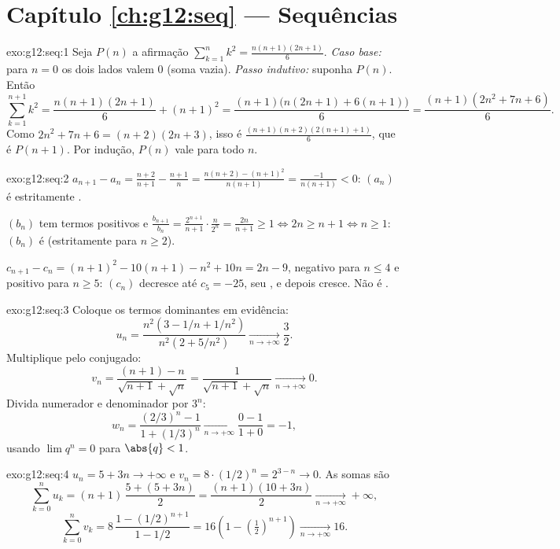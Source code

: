 \section*{Capítulo \ref{ch:g12:seq} --- Sequências}

\begin{solution}{exo:g12:seq:1}
Seja $P(n)$ a afirmação
$\sum_{k=1}^{n} k^2 = \frac{n(n+1)(2n+1)}{6}$.
\emph{Caso base:} para $n = 0$ os dois lados valem $0$ (soma vazia).
\emph{Passo indutivo:} suponha $P(n)$. Então
\[
\sum_{k=1}^{n+1} k^2 = \frac{n(n+1)(2n+1)}{6} + (n+1)^2
= \frac{(n+1)\bigl(n(2n+1) + 6(n+1)\bigr)}{6}
= \frac{(n+1)(2n^2 + 7n + 6)}{6}.
\]
Como $2n^2 + 7n + 6 = (n+2)(2n+3)$, isso é
$\frac{(n+1)(n+2)(2(n+1)+1)}{6}$, que é $P(n+1)$. Por indução, $P(n)$
vale para todo $n$.
\end{solution}

\begin{solution}{exo:g12:seq:2}
$a_{n+1} - a_n = \frac{n+2}{n+1} - \frac{n+1}{n}
= \frac{n(n+2) - (n+1)^2}{n(n+1)} = \frac{-1}{n(n+1)} < 0$: $(a_n)$ é
estritamente .

$(b_n)$ tem termos positivos e
$\frac{b_{n+1}}{b_n} = \frac{2^{n+1}}{n+1}\cdot\frac{n}{2^n} =
\frac{2n}{n+1} \geq 1 \iff 2n \geq n+1 \iff n \geq 1$: $(b_n)$ é 
(estritamente para $n \geq 2$).

$c_{n+1} - c_n = (n+1)^2 - 10(n+1) - n^2 + 10n = 2n - 9$, negativo para
$n \leq 4$ e positivo para $n \geq 5$: $(c_n)$ decresce até
$c_5 = -25$, seu , e depois cresce. Não é .
\end{solution}

\begin{solution}{exo:g12:seq:3}
Coloque os termos dominantes em evidência:
\[
u_n = \frac{n^2(3 - 1/n + 1/n^2)}{n^2(2 + 5/n^2)} \xrightarrow[n\to+\infty]{} \frac{3}{2}.
\]
Multiplique pelo conjugado:
\[
v_n = \frac{(n+1) - n}{\sqrt{n+1} + \sqrt{n}} = \frac{1}{\sqrt{n+1}+\sqrt{n}}
\xrightarrow[n\to+\infty]{} 0.
\]
Divida numerador e denominador por $3^n$:
\[
w_n = \frac{(2/3)^n - 1}{1 + (1/3)^n} \xrightarrow[n\to+\infty]{} \frac{0-1}{1+0} = -1,
\]
usando $\lim q^n = 0$ para $\abs{q} < 1$.
\end{solution}

\begin{solution}{exo:g12:seq:4}
$u_n = 5 + 3n \to +\infty$ e $v_n = 8 \cdot (1/2)^n = 2^{3-n} \to 0$. As
somas são
\[
\sum_{k=0}^{n} u_k = (n+1)\,\frac{5 + (5+3n)}{2} = \frac{(n+1)(10+3n)}{2}
\xrightarrow[n\to+\infty]{} +\infty,
\]
\[
\sum_{k=0}^{n} v_k = 8\,\frac{1 - (1/2)^{n+1}}{1 - 1/2}
= 16\left(1 - \left(\tfrac{1}{2}\right)^{n+1}\right)
\xrightarrow[n\to+\infty]{} 16 .
\]
\end{solution}

